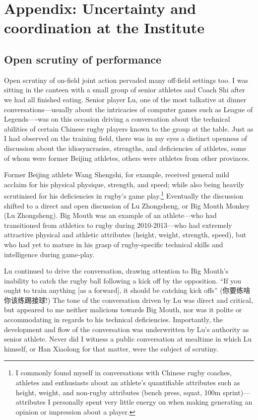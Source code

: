 \chapter{\label{app5:ethnoField}Appendix: Uncertainty and coordination at the Institute}

  \begin{CJK}{UTF8}{gbsn}




\section{Open scrutiny of performance\label{app5:openScrutinyLZS}}

Open scrutiny of on-field joint action pervaded many off-field settings too.  I was sitting in the canteen with a small group of senior athletes and Coach Shi after we had all finished eating.  Senior player Lu, one of the most talkative at dinner conversations---usually about the intricacies of computer games such as League of Legends----was on this occasion driving a conversation about the technical abilities of certain Chinese rugby players known to the group at the table.  Just as I had observed on the training field, there was in my eyes a distinct openness of discussion about the idiosyncrasies, strengths, and deficiencies of athletes, some of whom were former Beijing athletes, others were athletes from other provinces.

Former Beijing athlete Wang Shengshi, for example, received general mild acclaim for his physical physique, strength, and speed; while also being heavily scrutinised for his deficiencies in rugby's game play.\footnote{I commonly found myself in conversations with Chinese rugby coaches, athletes and enthusiasts about an athlete's quantifiable attributes such as height, weight, and non-rugby attributes (bench press, squat, 100m sprint)---attributes I personally spent very little energy on when making generating an opinion or impression about a player.}  Eventually the discussion shifted to a direct and open discussion of Lu Zhongsheng, or Big Mouth Monkey (Lu Zhongsheng).  Big Mouth was an example of an athlete---who had transitioned from athletics to rugby during 2010-2013---who had extremely attractive physical and athletic attributes (height, weight, strength, speed), but who had yet to mature in his grasp of rugby-specific technical skills and intelligence during game-play.

Lu continued to drive the conversation, drawing attention to Big Mouth's inability to catch the rugby ball following a kick off by the opposition. ``If you ought to train anything [as a forward], it should be catching kick offs'' (你要练啥你该练踢接球!)  The tone of the conversation driven by Lu was direct and critical, but appeared to me neither malicious towards Big Mouth, nor was it polite or accommodating in regards to his technical deficiencies.  Importantly, the development and flow of the conversation was underwritten by Lu's authority as senior athlete.  Never did I witness a public conversation at mealtime in which Lu himself, or Han Xiaolong for that matter, were the subject of scrutiny.


\end{CJK}
